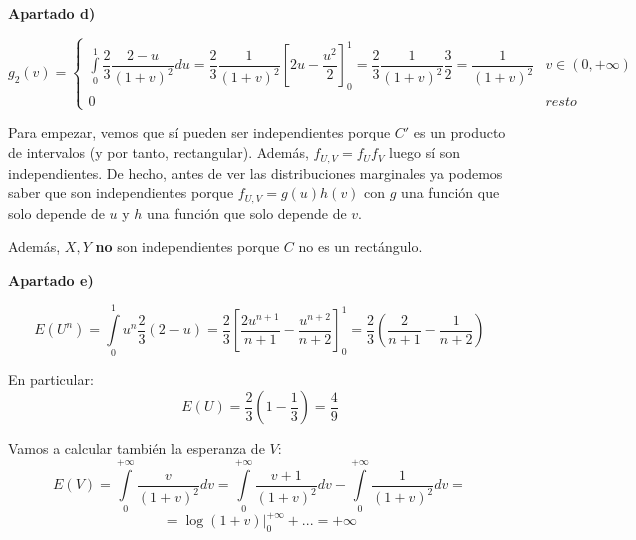 \documentclass[openany]{book}
\begin{document}
\begin{exercise}
    \begin{flushright}
        \textbf{Apartado d)}

    \end{flushright}

    $$ g_{2}(v) = \left\{
    \begin{array}{ll}
        \int\limits_{0}^{1} \dfrac{2}{3} \dfrac{2-u}{(1+v)^2} du = \dfrac{2}{3} \dfrac{1}{(1+v)^2} \left[ 2u-\dfrac{u^2}{2} \right]_{0}^{1} = \dfrac{2}{3}\dfrac{1}{(1+v)^2} \dfrac{3}{2} = \dfrac{1}{(1+v)^2} & v \in (0,+\infty)\\
        0 & resto
    \end{array}
    \right. $$

    Para empezar, vemos que sí pueden ser independientes porque $ C' $ es un producto de intervalos (y por tanto, rectangular). Además, $ f_{U,V} = f_{U}f_{V} $ luego sí son independientes. De hecho, antes de ver las distribuciones marginales ya podemos saber que son independientes porque $ f_{U,V} = g(u)h(v)$ con $ g $ una función que solo depende de $ u $ y $ h $ una función que solo depende de $ v $.

    Además, $ X,Y $ \textbf{no} son independientes porque $ C $ no es un rectángulo.

    \begin{flushright}
        \textbf{Apartado e)}
    \end{flushright}

    $$ E(U^{n}) = \int\limits_{0}^{1} u^{n} \dfrac{2}{3}(2-u) = \dfrac{2}{3} \left[ \dfrac{2u^{n+1}}{n+1}-\dfrac{u^{n+2}}{n+2} \right]^1_{0} = \dfrac{2}{3} \left( \dfrac{2}{n+1}-\dfrac{1}{n+2} \right) $$

    En particular:
    $$ E(U) = \dfrac{2}{3} \left( 1-\dfrac{1}{3} \right) = \dfrac{4}{9} $$

    Vamos a calcular también la esperanza de $ V $:
    $$ E(V) = \int\limits_{0}^{+\infty} \dfrac{v}{(1+v)^2}dv = \int\limits_{0}^{+\infty} \dfrac{v+1}{(1+v)^2} dv - \int\limits_{0}^{+\infty}\dfrac{1}{(1+v)^2}dv = $$
    $$  = \log(1+v) \Biggr|_{0}^{+\infty} + ... = +\infty $$
\end{exercise}
\end{document}
